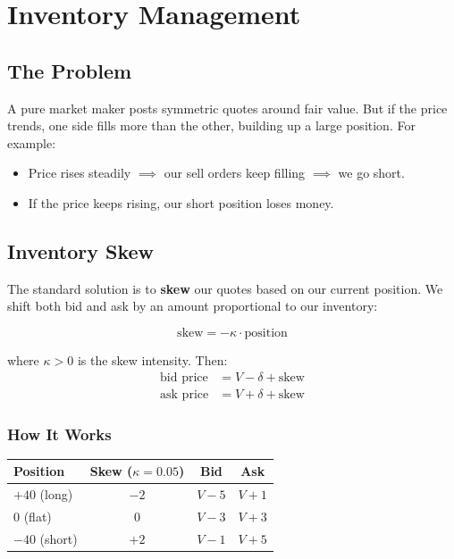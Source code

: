 \documentclass[11pt, letterpaper]{article}
\begin{document}
\section{Inventory Management}

\subsection{The Problem}

A pure market maker posts symmetric quotes around fair value. But if the price trends, one side fills more than the other, building up a large position. For example:
\begin{itemize}
    \item Price rises steadily $\implies$ our sell orders keep filling $\implies$ we go short.
    \item If the price keeps rising, our short position loses money.
\end{itemize}

\subsection{Inventory Skew}

The standard solution is to \textbf{skew} our quotes based on our current position. We shift both bid and ask by an amount proportional to our inventory:

\begin{equation}
    \text{skew} = -\kappa \cdot \text{position}
\end{equation}

where $\kappa > 0$ is the skew intensity. Then:
\begin{align}
    \text{bid price} &= V - \delta + \text{skew} \\
    \text{ask price} &= V + \delta + \text{skew}
\end{align}

\subsubsection{How It Works}

\begin{center}
\begin{tabular}{lccc}
\toprule
\textbf{Position} & \textbf{Skew} ($\kappa=0.05$) & \textbf{Bid} & \textbf{Ask} \\
\midrule
$+40$ (long) & $-2$ & $V - 5$ & $V + 1$ \\
$0$ (flat) & $0$ & $V - 3$ & $V + 3$ \\
$-40$ (short) & $+2$ & $V - 1$ & $V + 5$ \\
\bottomrule
\end{tabular}
\end{center}
\end{document}
